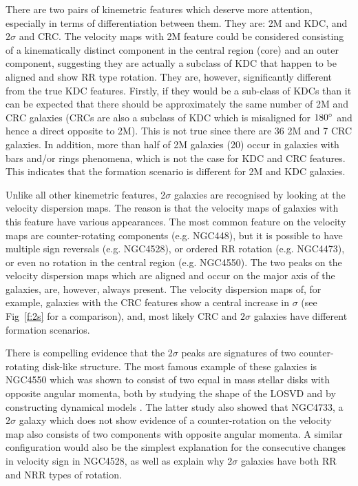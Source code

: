 \documentclass[usenatbib,usegraphicx]{mn2e}
\begin{document}
There are two pairs of kinemetric features which deserve more attention, especially in terms of differentiation between them. They are: 2M and KDC, and $2\sigma$ and CRC. The velocity maps with 2M feature could be considered consisting of a kinematically distinct component in the central region (core) and an outer component, suggesting they are actually a subclass of KDC that happen to be aligned and show RR type rotation. They are, however, significantly different from the true KDC features. Firstly, if they would be a sub-class of KDCs than it can be expected that there should be approximately the same number of 2M and CRC galaxies (CRCs are also a subclass of KDC which is misaligned for $180\hbox{$^\circ$}$ and hence a direct opposite to 2M). This is not true since there are 36 2M and 7 CRC galaxies. In addition, more than half of 2M galaxies (20) occur in galaxies with bars and/or rings phenomena, which is not the case for KDC and CRC features. This indicates that the formation scenario is different for 2M and KDC galaxies. 

Unlike all other kinemetric features, 2$\sigma$ galaxies are recognised by looking at the velocity dispersion maps. The reason is that the velocity maps of galaxies with this feature have various appearances. The most common feature on the velocity maps are counter-rotating components (e.g. NGC448), but it is possible to have multiple sign reversals (e.g. NGC4528), or ordered RR rotation (e.g. NGC4473), or even no rotation in the central region (e.g. NGC4550). The two peaks on the velocity dispersion maps which are aligned and occur on the major axis of the galaxies, are, however, always present.  The velocity dispersion maps of, for example, galaxies with the CRC features show a central increase in $\sigma$ (see Fig~\ref{f:2s} for a comparison), and, most likely CRC and $2\sigma$ galaxies have different formation scenarios. 

There is compelling evidence that the $2\sigma$ peaks are signatures of two counter-rotating disk-like structure. The most famous example of these galaxies is NGC4550 which was shown to consist of two equal in mass stellar disks with opposite angular momenta, both by studying the shape of the LOSVD \citep{1992ApJ...394L...9R,1992ApJ...400L...5R} and by constructing dynamical models \citep{2007MNRAS.379..418C}.  The latter study also showed that NGC4733, a $2\sigma$ galaxy which does not show evidence of a counter-rotation on the velocity map also consists of two components with opposite angular momenta. A similar configuration would also be the simplest explanation for the consecutive changes in velocity sign in NGC4528, as well as explain why 2$\sigma$ galaxies have both RR and NRR types of rotation. 
\end{document}

